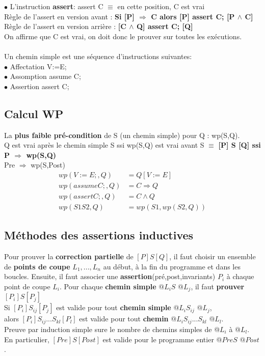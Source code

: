 $\bullet$ L'instruction \textbf{assert}: assert C $\equiv$ en cette position, C est vrai\\
Règle de l'assert en version avant : \textbf{Si [P] $\Rightarrow$ C alors [P] assert C; [P $\wedge$ C]}\\
Règle de l'assert en version arrière : \textbf{[C $\wedge$ Q] assert C; [Q]}\\
On affirme que C est vrai, on doit donc le prouver sur toutes les exécutions.\\ \vspace{5mm}\\

Un chemin simple est une séquence d'instructions suivantes:\\
$\bullet$ Affectation V:=E;\\
$\bullet$ Assomption assume C;\\
$\bullet$ Assertion assert C;
\vfill
\subsection{Calcul WP}
La \textbf{plus faible pré-condition} de S (un chemin simple) pour Q : wp(S,Q).\\
Q est vrai après le chemin simple S ssi wp(S,Q) est vrai avant S $\equiv$ \textbf{[P] S [Q] ssi P $\Rightarrow$ wp(S,Q)}\\
Pre $\Rightarrow$ wp(S,Post)
\begin{align*}
	wp(V:=E;, Q) &= Q[V:=E]\\
	wp(assume C;, Q) &= C \Rightarrow Q\\
	wp(assert C;, Q) &= C \wedge Q\\
	wp(S1 S2, Q) &= wp(S1, wp(S2,Q))
\end{align*}
\subsection{Méthodes des assertions inductives}
Pour prouver la \textbf{ correction partielle} de $[P] S [Q]$, il faut choisir un ensemble de \textbf{points de coupe} $L_1,...,L_n$ au début, à la fin du programme et dans les boucles. Ensuite, il faut associer une \textbf{assertion}(pré,post,invariants) $P_i$ à chaque point de coupe $L_i$. Pour chaque \textbf{chemin simple} @$L_i S$ @$L_j$, il faut \textbf{prouver} $[P_i] S [P_j]$\\

Si $[P_i] S_{ij}[P_j]$ est  valide pour tout \textbf{chemin simple} @$L_i S_{ij}$ @$L_j$,\\
alors  $[P_i] S_{ij}...S_{kl} [P_l]$ est valide pour tout \textbf{chemin}  @$L_i S_{ij}...S_{kl}$ @$L_l$.\\
Preuve par induction simple sure le nombre de chemins simples de @$L_i$ à  @$L_l$.\\
En particulier, $[Pre] S [Post]$ est valide pour le programme entier @$Pre S$ @$Post$.
